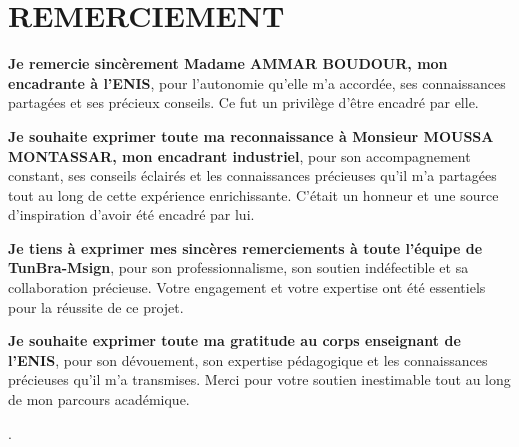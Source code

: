 \chapter*{REMERCIEMENT}
\thispagestyle{MyStyle}




\vspace{0.5cm}

\textbf{Je remercie sincèrement Madame AMMAR BOUDOUR, mon encadrante à l'ENIS}, pour l'autonomie qu'elle m'a accordée, ses connaissances partagées et ses précieux conseils. Ce fut un privilège d'être encadré par elle.

\vspace{0.5cm}

\textbf{Je souhaite exprimer toute ma reconnaissance à Monsieur MOUSSA MONTASSAR, mon encadrant industriel}, pour son accompagnement constant, ses conseils éclairés et les connaissances précieuses qu'il m'a partagées tout au long de cette expérience enrichissante. C'était un honneur et une source d'inspiration d'avoir été encadré par lui.

\vspace{0.5cm}

\textbf{Je tiens à exprimer mes sincères remerciements à toute l'équipe de TunBra-Msign}, pour son professionnalisme, son soutien indéfectible et sa collaboration précieuse. Votre engagement et votre expertise ont été essentiels pour la réussite de ce projet.

\vspace{0.5cm}

\textbf{Je souhaite exprimer toute ma gratitude au corps enseignant de l'ENIS}, pour son dévouement, son expertise pédagogique et les connaissances précieuses qu'il m'a transmises. Merci pour votre soutien inestimable tout au long de mon parcours académique.




















.\par
